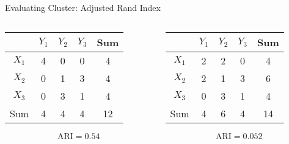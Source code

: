\documentclass{beamer}
\begin{document}
	\begin{frame}{Evaluating Cluster: Adjusted Rand Index}
		
		\begin{columns}
			\begin{column}{0.48\linewidth}
			\begin{table}[htbp]
				\centering
				\begin{tabular}{c|c|c|c|c}
					&$Y_1$ & $Y_2$ & $Y_3$ & Sum \\
					\hline
					$X_1$ & 4  & 0  &  0 & 4 \\
					\hline
					$X_2$ & 0 & 1 & 3 & 4\\
					\hline
					$X_3$ & 0 & 3 & 1 & 4\\
					\hline					
					Sum & 4 & 4 & 4 & 12  
				\end{tabular}
			\end{table}
			
			$$  \text{ARI} = 0.54  $$
		\end{column}
		
		\begin{column}{0.48\linewidth}
			\begin{table}[htbp]
				\centering
				\begin{tabular}{c|c|c|c|c}
					&$Y_1$ & $Y_2$ & $Y_3$ & Sum \\
					\hline
					$X_1$ & 2  & 2  &  0 & 4 \\
					\hline
					$X_2$ & 2 & 1 & 3 & 6\\
					\hline
					$X_3$ & 0 & 3 & 1 & 4\\
					\hline					
					Sum & 4 & 6 & 4 & 14  
				\end{tabular}
			\end{table}

			$$  \text{ARI} = 0.052  $$			
			
		\end{column}
		\end{columns}	
		
	\end{frame}	
	
\end{document}
